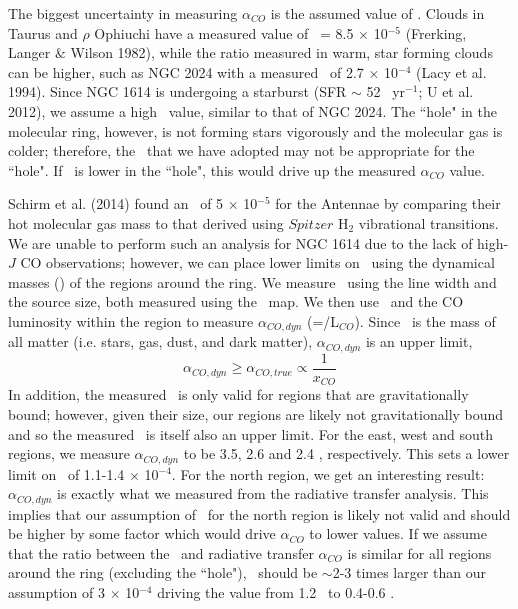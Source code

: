 The biggest uncertainty in measuring $\alpha_{CO}$ is the assumed value of \xh. Clouds in Taurus and $\rho$ Ophiuchi have a measured value of \xh\ = 8.5 $\times$ 10$^{-5}$ (Frerking, Langer $\&$ Wilson 1982)\nocite{Frerking1982}, while the ratio measured in warm, star forming clouds can be higher, such as NGC 2024 with a measured \xh\ of 2.7 $\times$ 10$^{-4}$ (Lacy et al. 1994)\nocite{Lacy1994}. Since NGC 1614 is undergoing a starburst (SFR $\sim$ 52 \msol\ yr$^{-1}$; U et al. 2012)\nocite{U2012}, we assume a high \xh\ value, similar to that of NGC 2024. The ``hole" in the molecular ring, however, is not forming stars vigorously and the molecular gas is colder; therefore, the \xh\ that we have adopted may not be appropriate for the ``hole". If \xh\ is lower in the ``hole", this would drive up the measured $\alpha_{CO}$ value. 

Schirm et al. (2014)\nocite{Schirm2014} found an \xh\ of 5 $\times$ 10$^{-5}$ for the Antennae by comparing their hot molecular gas mass to that derived using $Spitzer$ H$_{2}$ vibrational transitions. We are unable to perform such an analysis for NGC 1614 due to the lack of high-$J$ CO observations; however, we can place lower limits on \xh\ using the dynamical masses (\mdyn) of the regions around the ring. We measure \mdyn\ using the line width and the source size, both measured using the \cothree\ map. We then use \mdyn\ and the CO luminosity within the region to measure $\alpha_{CO, dyn}$ (=\mdyn/L$_{CO}$). Since \mdyn\ is the mass of all matter (i.e. stars, gas, dust, and dark matter), $\alpha_{CO, dyn}$ is an upper limit,
\begin{equation}
\alpha_{CO, dyn} \geq \alpha_{CO, true} \propto \frac{1}{x_{CO}}
\end{equation}
In addition, the measured \mdyn\ is only valid for regions that are gravitationally bound; however, given their size, our regions are likely not gravitationally bound and so the measured \mdyn\ is itself also an upper limit. For the east, west and south regions, we measure $\alpha_{CO,dyn}$ to be 3.5, 2.6 and 2.4 \alphaco, respectively. This sets a lower limit on \xh\ of 1.1-1.4 $\times$ 10$^{-4}$. For the north region, we get an interesting result: $\alpha_{CO, dyn}$ is exactly what we measured from the radiative transfer analysis. This implies that our assumption of \xh\ for the north region is likely not valid and should be higher by some factor which would drive $\alpha_{CO}$ to lower values. If we assume that the ratio between the \mdyn\ and radiative transfer $\alpha_{CO}$  is similar for all regions around the ring (excluding the ``hole"), \xh\ should be $\sim$2-3 times larger than our assumption of 3 $\times$ 10$^{-4}$ driving the value from 1.2 \alphaco\ to 0.4-0.6 \alphaco. 


